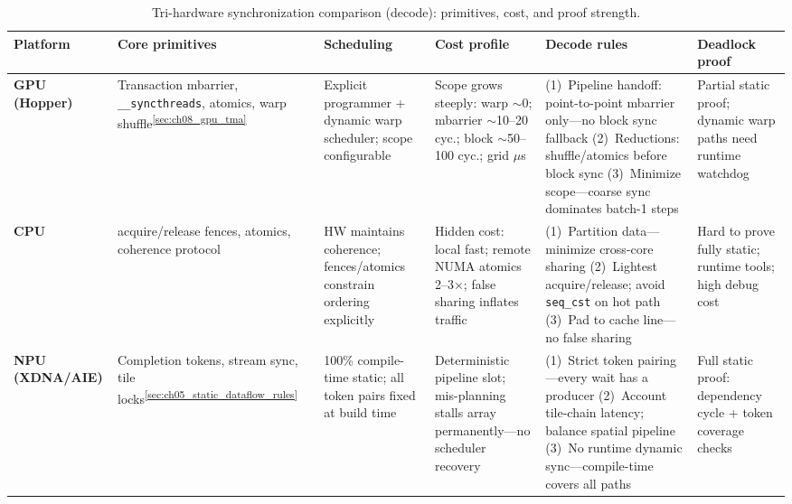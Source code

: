 \begin{table}[t]
\centering
\footnotesize
\caption{Tri-hardware synchronization comparison (decode): primitives, cost, and proof strength.}
\label{tab:ch09_tri_hw_sync}
\begin{tabular}{@{}p{1.35cm}p{1.55cm}p{1.45cm}p{1.45cm}p{2.05cm}p{1.35cm}@{}}
\toprule
\textbf{Platform} & \textbf{Core primitives} & \textbf{Scheduling} & \textbf{Cost profile} & \textbf{Decode rules} & \textbf{Deadlock proof} \\
\midrule
\textbf{GPU (Hopper)} &
Transaction mbarrier, \texttt{\_\_syncthreads}, atomics, warp shuffle\textsuperscript{\ref{sec:ch08_gpu_tma}} &
Explicit programmer + dynamic warp scheduler; scope configurable &
Scope grows steeply: warp ${\sim}$0; mbarrier ${\sim}$10--20 cyc.; block ${\sim}$50--100 cyc.; grid $\mu$s &
(1)~Pipeline handoff: point-to-point mbarrier only---no block sync fallback\newline
(2)~Reductions: shuffle/atomics before block sync\newline
(3)~Minimize scope---coarse sync dominates batch-1 steps &
Partial static proof; dynamic warp paths need runtime watchdog \\
\midrule
\textbf{CPU} &
acquire/release fences, atomics, coherence protocol &
HW maintains coherence; fences/atomics constrain ordering explicitly &
Hidden cost: local fast; remote NUMA atomics 2--3$\times$; false sharing inflates traffic &
(1)~Partition data---minimize cross-core sharing\newline
(2)~Lightest acquire/release; avoid \texttt{seq\_cst} on hot path\newline
(3)~Pad to cache line---no false sharing &
Hard to prove fully static; runtime tools; high debug cost \\
\midrule
\textbf{NPU (XDNA/AIE)} &
Completion tokens, stream sync, tile locks\textsuperscript{\ref{sec:ch05_static_dataflow_rules}} &
100\% compile-time static; all token pairs fixed at build time &
Deterministic pipeline slot; mis-planning stalls array permanently---no scheduler recovery &
(1)~Strict token pairing---every wait has a producer\newline
(2)~Account tile-chain latency; balance spatial pipeline\newline
(3)~No runtime dynamic sync---compile-time covers all paths &
Full static proof: dependency cycle + token coverage checks \\
\bottomrule
\end{tabular}
\end{table}

